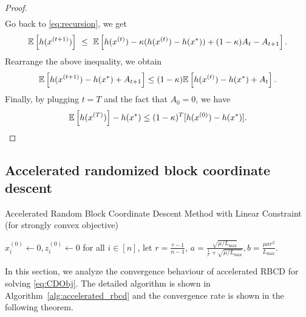 \begin{proof}
\begin{align}
    \end{align}
    Go back to \eqref{eq:recursion}, we get
    \begin{align}
        \mathbb{E} \left[ h( x^{(t+1)} ) \right] ~\leq~ \mathbb{E}\left[ h(x^{(t)}) - \kappa ( h(x^{(t)}) - h(x^*) ) + (1 - \kappa) A_t - A_{t+1} \right].
    \end{align}
    Rearrange the above inequality, we obtain
    \[
        \mathbb{E} \left[ h( x^{(t+1)} ) - h(x^*) + A_{t+1} \right] \leq (1 - \kappa)  \mathbb{E} \left[ h( x^{(t)} ) - h(x^*) + A_{t} \right].
    \]
    Finally, by plugging $t = T$ and the fact that $A_0 = 0$, we have 
    \[\mathbb{E} \left[ h( x^{(T)} )\right] - h(x^*) \leq (1 - \kappa)^T[h(x^{(0)}) - h(x^*)].\]
\end{proof}


\subsection{Accelerated randomized block coordinate descent} \label{appendix:accelerated_rbcd}

\begin{algorithm}[t]
    \DontPrintSemicolon
    \caption{Accelerated Random Block Coordinate Descent Method with Linear Constraint (for strongly convex objective)}
    \label{alg:accelerated_rbcd}
    \smallskip
    $x_i^{(0)} \gets 0, z_i^{(0)} \gets 0$ for all $i \in [n]$, let $r =\frac{\tau-1}{n-1}$, $a = \frac{\sqrt{\mu/L_{\max}}}{\frac{1}{r} + \sqrt{\mu/L_{\max}}}, b = \frac{\mu a r^2}{L_{\max}}$. 
\end{algorithm}

In this section, we analyze the convergence behaviour of accelerated RBCD for solving \eqref{eq:CDObj}. The detailed algorithm is shown in Algorithm~\ref{alg:accelerated_rbcd} and the convergence rate is shown in the following theorem. 


